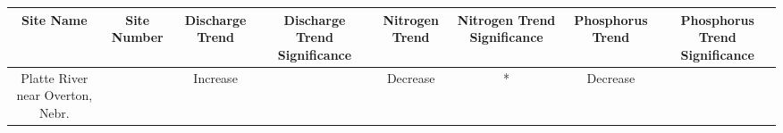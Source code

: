 \documentclass[12pt,]{article}
\begin{document}
\begin{longtable}[]{@{}cccccccc@{}}
\toprule
\begin{minipage}[b]{0.06\columnwidth}\centering
Site Name\strut
\end{minipage} & \begin{minipage}[b]{0.07\columnwidth}\centering
Site Number\strut
\end{minipage} & \begin{minipage}[b]{0.08\columnwidth}\centering
Discharge Trend\strut
\end{minipage} & \begin{minipage}[b]{0.13\columnwidth}\centering
Discharge Trend Significance\strut
\end{minipage} & \begin{minipage}[b]{0.08\columnwidth}\centering
Nitrogen Trend\strut
\end{minipage} & \begin{minipage}[b]{0.16\columnwidth}\centering
Nitrogen Trend Significance\strut
\end{minipage} & \begin{minipage}[b]{0.09\columnwidth}\centering
Phosphorus Trend\strut
\end{minipage} & \begin{minipage}[b]{0.13\columnwidth}\centering
Phosphorus Trend Significance\strut
\end{minipage}\tabularnewline
\midrule
\endhead
\begin{minipage}[t]{0.06\columnwidth}\centering
Platte River near Overton, Nebr.\strut
\end{minipage} & \begin{minipage}[t]{0.07\columnwidth}\centering
06768000\strut
\end{minipage} & \begin{minipage}[t]{0.08\columnwidth}\centering
Increase\strut
\end{minipage} & \begin{minipage}[t]{0.13\columnwidth}\centering
\strut
\end{minipage} & \begin{minipage}[t]{0.08\columnwidth}\centering
Decrease\strut
\end{minipage} & \begin{minipage}[t]{0.16\columnwidth}\centering
*\strut
\end{minipage} & \begin{minipage}[t]{0.09\columnwidth}\centering
Decrease\strut
\end{minipage} & \begin{minipage}[t]{0.13\columnwidth}\centering

\end{minipage}
\end{longtable}
\end{document}
